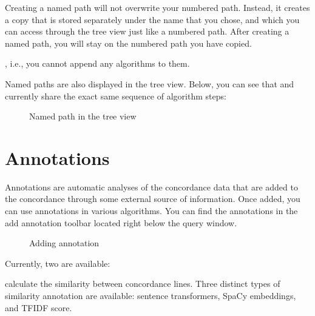 \documentclass[letterpaper,10pt,english]{sphinxmanual}
\begin{document}
\sphinxAtStartPar
Creating a named path will not overwrite your numbered path. Instead, it
creates a copy that is stored separately under the name that you chose,
and which you can access through the tree view just like a numbered path.
After creating a named path, you will stay on the numbered path you have
copied.

\sphinxAtStartPar
{}, i.e., you cannot append any algorithms to
them.

\sphinxAtStartPar
Named paths are also displayed in the tree view. Below, you can see that
 and  currently share the exact same sequence of
algorithm steps:

\begin{figure}[htbp]
\centering
\capstart

\noindent{}
\caption{Named path in the tree view}\label{\detokenize{clicanalysis/flexiconc:id9}}\label{\detokenize{clicanalysis/flexiconc:flexiclic-named-path-tree}}\end{figure}


\section{Annotations}
\label{\detokenize{clicanalysis/flexiconc:annotations}}
\sphinxAtStartPar
Annotations are automatic analyses of the concordance data that are
added to the concordance through some external source of information.
Once added, you can use annotations in various algorithms. You can find
the annotations in the add annotation toolbar located right below the
query window.

\begin{figure}[htbp]
\centering
\capstart

\noindent{}
\caption{Adding annotation}\label{\detokenize{clicanalysis/flexiconc:id10}}\label{\detokenize{clicanalysis/flexiconc:flexiclic-annotations}}\end{figure}

\sphinxAtStartPar
Currently, two  are available:

\sphinxAtStartPar
{} calculate the similarity between concordance
lines. Three distinct types of similarity annotation are available:
sentence transformers, SpaCy embeddings, and TF\sphinxhyphen{}IDF score.
\end{document}
